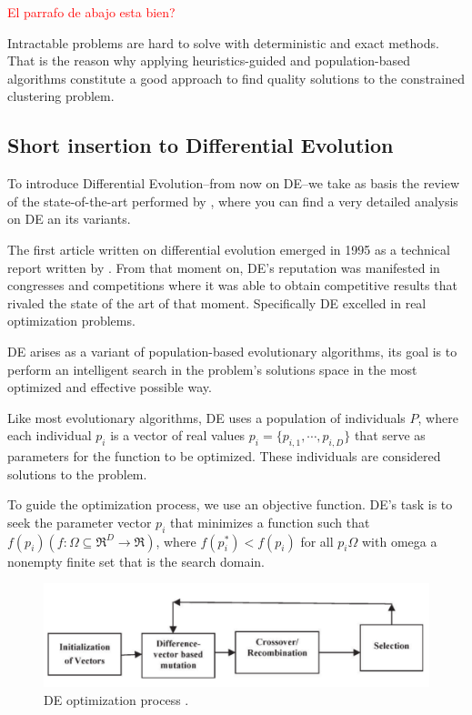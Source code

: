 \documentclass[review]{elsarticle}
\begin{document}
\textcolor{red}{El parrafo de abajo esta bien?}

Intractable problems are hard to solve with deterministic and exact methods. That is the reason why applying heuristics-guided and population-based algorithms constitute a good approach to find quality solutions to the constrained clustering problem.

\subsection{Short insertion to Differential Evolution}

To introduce Differential Evolution--from now on DE--we take as basis the review of the state-of-the-art performed by \cite{das2011differential}, where you can find a very detailed analysis on DE an its variants.

The first article written on differential evolution emerged in 1995 as a technical report written by \cite{noman2008differential}. From that moment on, DE's reputation was manifested in congresses and competitions where it was able to obtain competitive results that rivaled the state of the art of that moment. Specifically DE excelled in real optimization problems.

DE arises as a variant of population-based evolutionary algorithms, its goal is to perform an intelligent search in the problem's solutions space in the most optimized and effective possible way.

Like most evolutionary algorithms, DE uses a population of individuals $P$, where each individual $p_i$ is a vector of real values $p_i = \{p_{i,1},\cdots,p_{i,D}\}$ that serve as parameters for the function to be optimized. These individuals are considered solutions to the problem.

To guide the optimization process, we use an objective function. DE's task is to seek the parameter vector $p_i$ that minimizes a function such that $f(p_i)(f: \Omega \subseteq \mathfrak{R}^D \rightarrow \mathfrak{R})$, where $f(p_i^*) < f(p_i)$ for all $p_i \Omega$ with omega a nonempty finite set that is the search domain.

\begin{figure}[!h]
	\centering
	\includegraphics[scale=0.4]{Figures/DEop.png}
	\caption{DE optimization process \cite{das2011differential}.}\label{img:DE}
\end{figure}
\end{document}
